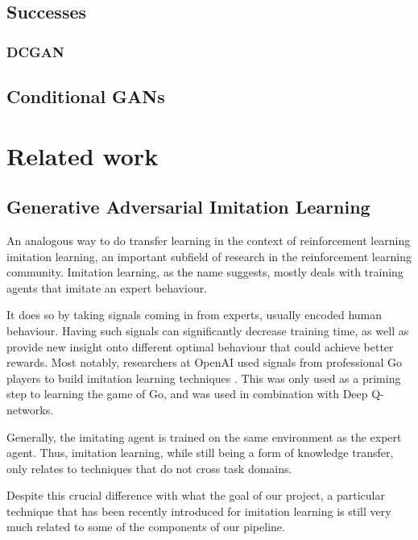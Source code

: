 \subsection{Successes}
\label{successes}
\subsubsection{DCGAN}

\subsection{Conditional GANs}


\section{Related work}
\subsection{Generative Adversarial Imitation Learning}

An analogous way to do transfer learning in the context of reinforcement learning imitation learning, an important subfield of research in the reinforcement learning community. Imitation learning, as the name suggests, mostly deals with training agents that imitate an expert behaviour. 

It does so by taking signals coming in from experts, usually encoded human behaviour. Having such signals can significantly decrease training time, as well as provide new insight onto different optimal behaviour that could achieve better rewards. Most notably, researchers at OpenAI used signals from professional Go players to build imitation learning techniques \citep{silver2016mastering}. This was only used as a priming step to learning the game of Go, and was used in combination with Deep Q-networks.

Generally, the imitating agent is trained on the same environment as the expert agent. Thus, imitation learning, while still being a form of knowledge transfer, only relates to techniques that do not cross task domains.

Despite this crucial difference with what the goal of our project, a particular technique that has been recently introduced for imitation learning is still very much related to some of the components of our pipeline.

